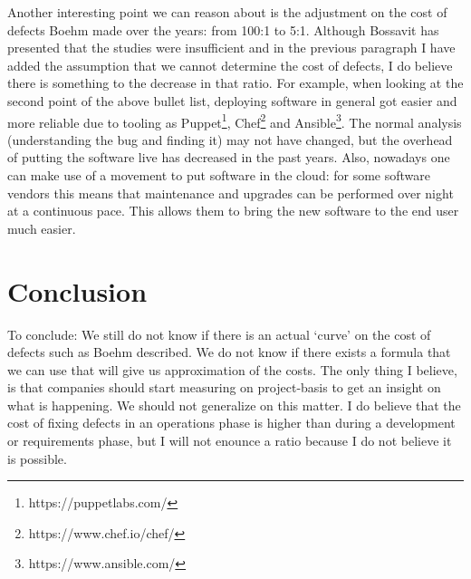 Another interesting point we can reason about is the adjustment on the cost of defects Boehm made over the years: from 100:1 to 5:1.
Although Bossavit has presented that the studies were insufficient and in the previous paragraph I have added the assumption that we cannot determine the cost of defects,
I do believe there is something to the decrease in that ratio.
For example, when looking at the second point of the above bullet list, deploying software in general got easier and more reliable due to tooling as Puppet\footnote{https://puppetlabs.com/}, Chef\footnote{https://www.chef.io/chef/} and Ansible\footnote{https://www.ansible.com/}.
The normal analysis (understanding the bug and finding it) may not have changed, but the overhead of putting the software live has decreased in the past years.
Also, nowadays one can make use of a movement to put software in the cloud: for some software vendors this means that maintenance and upgrades can be performed over night at a continuous pace.
This allows them to bring the new software to the end user much easier.

\section*{Conclusion}

To conclude: We still do not know if there is an actual `curve' on the cost of defects such as Boehm described.
We do not know if there exists a formula that we can use that will give us approximation of the costs.
The only thing I believe, is that companies should start measuring on project-basis to get an insight on what is happening.
We should not generalize on this matter.
I do believe that the cost of fixing defects in an operations phase is higher than during a development or requirements phase,
but I will not enounce a ratio because I do not believe it is possible.
